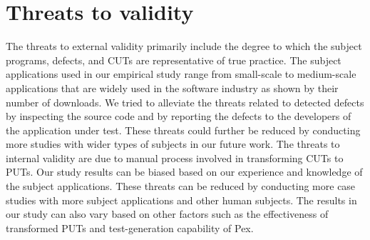\section{Threats to validity}
\label{sec:tov}

The threats to external validity primarily include the degree to which the subject programs, defects, and CUTs are representative of true practice. The subject applications used in our empirical study range from small-scale to medium-scale applications that are widely used in the software industry as shown by their number of downloads. We tried to alleviate the threats related to detected defects by inspecting the source code and by reporting the defects to the developers of the application under test. These threats could further be reduced by conducting more studies with wider types of subjects in our future work. The threats to internal validity are due to manual process involved in transforming CUTs to PUTs. Our study results can be biased based on our experience and knowledge of the subject applications. These threats can be reduced by conducting more case studies with more subject applications and other human subjects. The results in our study can also vary based on other factors such as the effectiveness of transformed PUTs and test-generation capability of Pex.